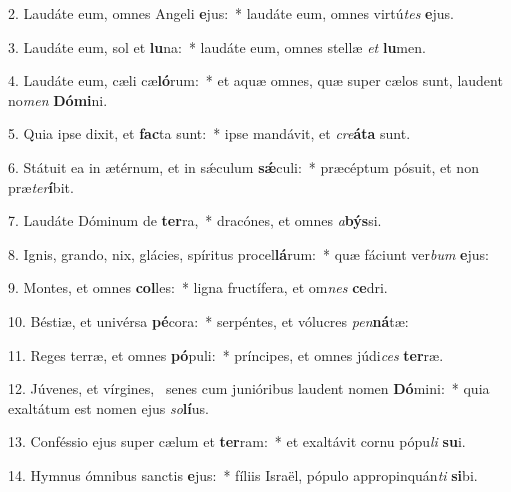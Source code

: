 2. Laudáte eum, omnes Angeli \textbf{e}jus:~*  laudáte eum, omnes virtú\textit{tes} \textbf{e}jus.\

3. Laudáte eum, sol et \textbf{lu}na:~*  laudáte eum, omnes stellæ \textit{et} \textbf{lu}men.\

4. Laudáte eum, cæli cæ\textbf{ló}rum:~*  et aquæ omnes, quæ super cælos sunt, laudent no\textit{men} \textbf{Dó}\textbf{mi}ni.\

5. Quia ipse dixit, et \textbf{fac}ta sunt:~*  ipse mandávit, et \textit{cre}\textbf{á}\textbf{ta} sunt.\

6. Státuit ea in ætérnum, et in sǽculum \textbf{sǽ}culi:~*  præcéptum pósuit, et non præ\textit{ter}\textbf{í}bit.\

7. Laudáte Dóminum de \textbf{ter}ra,~*  dracónes, et omnes \textit{a}\textbf{býs}si.\

8. Ignis, grando, nix, glácies, spíritus procel\textbf{lá}rum:~*  quæ fáciunt ver\textit{bum} \textbf{e}jus:\

9. Montes, et omnes \textbf{col}les:~*  ligna fructífera, et om\textit{nes} \textbf{ce}dri.\

10. Béstiæ, et univérsa \textbf{pé}cora:~*  serpéntes, et vólucres \textit{pen}\textbf{ná}tæ:\

11. Reges terræ, et omnes \textbf{pó}puli:~*  príncipes, et omnes júdi\textit{ces} \textbf{ter}ræ.\

12. Júvenes, et vírgines, \dag\  senes cum junióribus laudent nomen \textbf{Dó}mini:~*  quia exaltátum est nomen ejus \textit{so}\textbf{lí}us.\

13. Conféssio ejus super cælum et \textbf{ter}ram:~*  et exaltávit cornu pópu\textit{li} \textbf{su}i.\

14. Hymnus ómnibus sanctis \textbf{e}jus:~*  fíliis Israël, pópulo appropinquán\textit{ti} \textbf{si}bi.\

